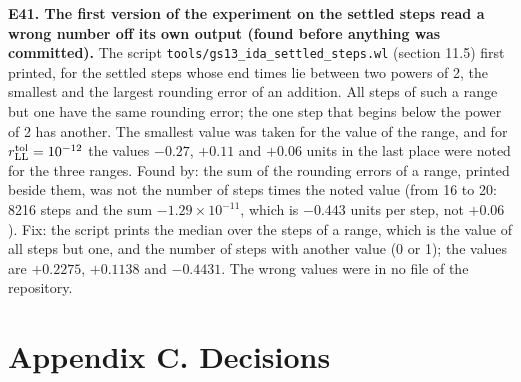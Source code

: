 \documentclass[
  10pt,
]{article}
\begin{document}
\textbf{E41. The first version of the experiment on the settled steps
read a wrong number off its own output (found before anything was
committed).} The script \texttt{tools/gs13\_ida\_settled\_steps.wl}
(section 11.5) first printed, for the settled steps whose end times lie
between two powers of 2, the smallest and the largest rounding error of
an addition. All steps of such a range but one have the same rounding
error; the one step that begins below the power of 2 has another. The
smallest value was taken for the value of the range, and for
\(r^{\rm tol}_{\rm LL}=10^{-12}\) the values \(-0.27\), \(+0.11\) and
\(+0.06\) units in the last place were noted for the three ranges. Found
by: the sum of the rounding errors of a range, printed beside them, was
not the number of steps times the noted value (from 16 to 20: 8216 steps
and the sum \(-1.29\times10^{-11}\), which is \(-0.443\) units per step,
not \(+0.06\)). Fix: the script prints the median over the steps of a
range, which is the value of all steps but one, and the number of steps
with another value (0 or 1); the values are \(+0.2275\), \(+0.1138\) and
\(-0.4431\). The wrong values were in no file of the repository.

\hypertarget{appendix-c.-decisions}{%
\section{Appendix C. Decisions}\label{appendix-c.-decisions}}
\end{document}
